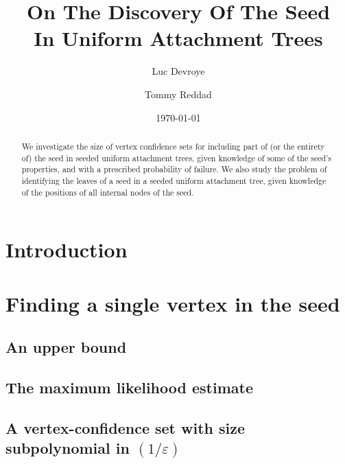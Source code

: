 \documentclass[letterpaper]{amsart}
\newcommand{\eps}{\varepsilon}
\newcommand{\seclabel}[1]{\label{sec:#1}}
\numberwithin{thm}{section}
\theoremstyle{definition}
\theoremstyle{plain}
\begin{document}
\title[On Discovery Of The Seed In UA Trees]{On The Discovery Of The Seed \\ In Uniform Attachment Trees}
\date{\today}
\author{Luc Devroye}
\author{Tommy Reddad}
\address{School of Computer Science, McGill University, 3480 University Street, Montr\'{e}al, Qu\'{e}bec, Canada, H3A 2K6}


\maketitle

\begin{abstract}
  We investigate the size of vertex confidence sets for including part
  of (or the entirety of) the seed in seeded uniform attachment trees,
  given knowledge of some of the seed's properties, and with a
  prescribed probability of failure. We also study the problem of
  identifying the leaves of a seed in a seeded uniform attachment
  tree, given knowledge of the positions of all internal nodes of the
  seed.
\end{abstract}

\section{Introduction}


\section{Finding a single vertex in the seed}\seclabel{heart}
  \subsection{An upper bound}\seclabel{heart-upper}
  
  \subsection{The maximum likelihood estimate}\seclabel{mle}
  
  \subsection{A vertex-confidence set with size subpolynomial in $(1/\eps)$} \seclabel{subpolynomial}
  
\end{document}
